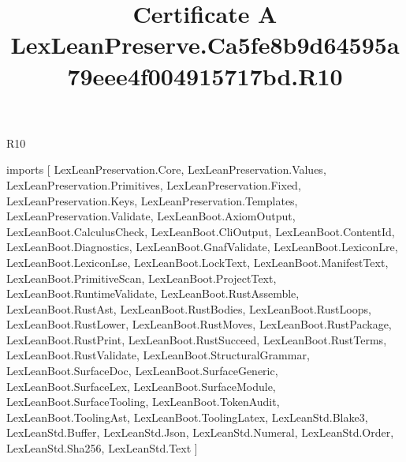 \begin{lexlean}{R10}
\title{Certificate A LexLeanPreserve.Ca5fe8b9d64595a79eee4f004915717bd.R10}
\begin{coremodule}
imports [
  LexLeanPreservation.Core,
  LexLeanPreservation.Values,
  LexLeanPreservation.Primitives,
  LexLeanPreservation.Fixed,
  LexLeanPreservation.Keys,
  LexLeanPreservation.Templates,
  LexLeanPreservation.Validate,
  LexLeanBoot.AxiomOutput,
  LexLeanBoot.CalculusCheck,
  LexLeanBoot.CliOutput,
  LexLeanBoot.ContentId,
  LexLeanBoot.Diagnostics,
  LexLeanBoot.GnafValidate,
  LexLeanBoot.LexiconLre,
  LexLeanBoot.LexiconLse,
  LexLeanBoot.LockText,
  LexLeanBoot.ManifestText,
  LexLeanBoot.PrimitiveScan,
  LexLeanBoot.ProjectText,
  LexLeanBoot.RuntimeValidate,
  LexLeanBoot.RustAssemble,
  LexLeanBoot.RustAst,
  LexLeanBoot.RustBodies,
  LexLeanBoot.RustLoops,
  LexLeanBoot.RustLower,
  LexLeanBoot.RustMoves,
  LexLeanBoot.RustPackage,
  LexLeanBoot.RustPrint,
  LexLeanBoot.RustSucceed,
  LexLeanBoot.RustTerms,
  LexLeanBoot.RustValidate,
  LexLeanBoot.StructuralGrammar,
  LexLeanBoot.SurfaceDoc,
  LexLeanBoot.SurfaceGeneric,
  LexLeanBoot.SurfaceLex,
  LexLeanBoot.SurfaceModule,
  LexLeanBoot.SurfaceTooling,
  LexLeanBoot.TokenAudit,
  LexLeanBoot.ToolingAst,
  LexLeanBoot.ToolingLatex,
  LexLeanStd.Blake3,
  LexLeanStd.Buffer,
  LexLeanStd.Json,
  LexLeanStd.Numeral,
  LexLeanStd.Order,
  LexLeanStd.Sha256,
  LexLeanStd.Text
]


\end{coremodule}
\end{lexlean}
